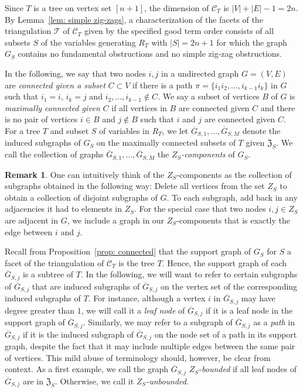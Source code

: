 \documentclass[11pt]{article}
\theoremstyle{definition}
\newtheorem{rema}[theo]{Remark}
\numberwithin{equation}{section}
\begin{document}
Since $T$ is a tree on vertex set $[n+1]$, the dimension of $\mathcal{C}_T$ is $|V| + |E| -1 = 2n$.  
By Lemma~\ref{lem: simple zig-zags}, a characterization of the facets of the triangulation $\mathcal{T}$ of $\mathcal{C}_T$ given by the specified good term order consists of  all subsets $S$ of the variables generating $R_T$ with $|S| = 2n+1$ for which the graph $G_S$ contains no fundamental obstructions and no simple zig-zag obstructions. 

In the following, we say that two nodes $i,j$ in a undirected graph $G = (V,E)$ are \emph{connected given a subset} $C\subset V$ if there is a path $\pi = \{i_1i_2,\ldots, i_{k-1}i_k\}$ in $G$ such that $i_1 = i$, $i_k = j$ and $i_2,\ldots, i_{k-1}\notin C$.  
We say a subset of vertices $B$ of $G$ is \emph{maximally connected given} $C$ if all vertices in $B$ are connected given $C$ and there is no pair of vertices $i\in B$ and $j\notin B$ such that $i$ and $j$ are connected given $C$. 
For a tree $T$ and subset $S$ of variables in $R_T$, we let $\overline{G}_{S,1},\ldots, \overline{G}_{S,M}$ denote the induced subgraphs of $G_S$ on the maximally connected subsets of $T$ given $\mathfrak{Z}_S$. 
We call the collection of graphs $\overline{G}_{S,1},\ldots, \overline{G}_{S,M}$ the \emph{$Z_S$-components} of $G_S$.
\begin{rema}
    \label{rmk:ZScomp_intuition}
    One can intuitively think of the $Z_S$-components as the collection of subgraphs obtained in the following way: Delete all vertices from the set $Z_S$ to obtain a collection of disjoint subgraphs of $G$. To each subgraph, add back in any adjacencies it had to elements in $Z_S$. For the special case that two nodes $i,j\in Z_S$ are adjacent in $G$, we include a graph in our $Z_S$-components that is exactly the edge between $i$ and $j$. 
\end{rema}

Recall from Proposition~\ref{prop: connected} that the support graph of $G_S$ for $S$ a facet of the triangulation of $\mathcal{C}_T$ is the tree $T$. 
Hence, the support graph of each $\overline{G}_{S,j}$ is a subtree of $T$. 
In the following, we will want to refer to certain subgraphs of $\overline{G}_{S,j}$ that are induced subgraphs of $\overline{G}_{S,j}$ on the vertex set of the corresponding induced subgraphs of $T$.  
For instance, although a vertex $i$ in $\overline{G}_{S,j}$ may have degree greater than $1$, we will call it a \emph{leaf node} of $\overline{G}_{S,j}$ if it is a leaf node in the support graph of $\overline{G}_{S,j}$.  
Similarly, we may refer to a subgraph of $\overline{G}_{S,j}$ as a \emph{path} in $\overline{G}_{S,j}$ if it is the induced subgraph of $\overline{G}_{S,j}$ on the node set of a path in its support graph, despite the fact that it may include multiple edges between the same pair of vertices.
This mild abuse of terminology should, however, be clear from context.
As a first example, we call the graph $\overline{G}_{S,j}$ \emph{$Z_S$-bounded} if all leaf nodes of $\overline{G}_{S,j}$ are in $\mathfrak{Z}_S$.  
Otherwise, we call it \emph{$Z_S$-unbounded}.
\end{document}
